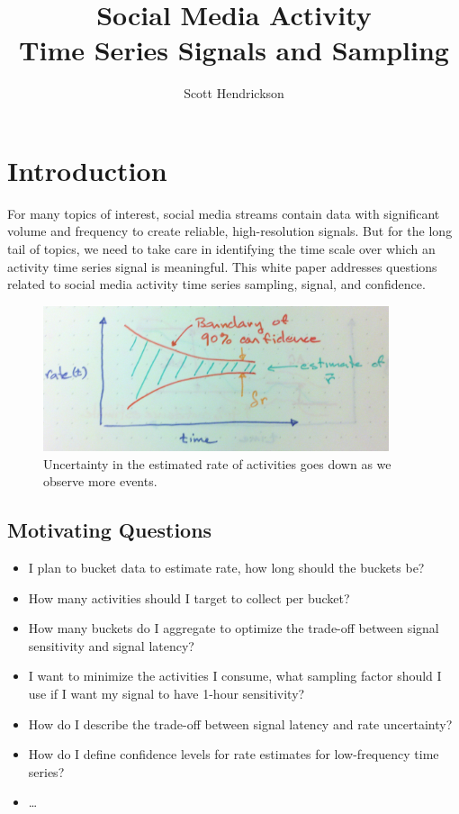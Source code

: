 \documentclass{article}
\title{Social Media Activity \\ \large{Time Series Signals and Sampling} }
\author[]{Scott Hendrickson}
\affil[]{Gnip, Inc.}
\begin{document}

\maketitle

\section{Introduction}

For many topics of interest, social media streams contain data with significant volume and frequency to create reliable, high-resolution signals.  But for the long tail of topics, we need to take care in identifying the time scale over which an activity time series signal is meaningful. This white paper addresses questions related to social media activity time series sampling, signal, and confidence.

\begin{figure}
    \centering
    \includegraphics[width=4.0in]{./imgs/confidence.jpg}
    \caption{Uncertainty in the estimated rate of activities goes down as we observe more events. }
    \label{fig:confidence}
\end{figure}

\subsection{Motivating Questions} %

\begin{itemize}
\item I plan to bucket data to estimate rate, how long should the buckets be? 
\item How many activities should I target to collect per bucket?
\item How many buckets do I aggregate to optimize the trade-off between signal sensitivity and signal latency?
\item I want to minimize the activities I consume, what sampling factor should I use if I want my signal to have 1-hour sensitivity?
\item How do I describe the trade-off between signal latency and rate uncertainty?
\item How do I define confidence levels for rate estimates for low-frequency time series?
\item \ldots
\end{itemize}
\end{document}
